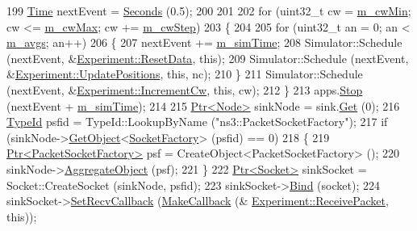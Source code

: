 \begin{DoxyCode}
199     \hyperlink{classns3_1_1Time}{Time} nextEvent = \hyperlink{group__timecivil_ga33c34b816f8ff6628e33d5c8e9713b9e}{Seconds} (0.5);
200 
201 
202     \textcolor{keywordflow}{for} (uint32\_t cw = \hyperlink{classExperiment_a2dbf3ad2a9b3a535c8bb9bb128e47ad3}{m\_cwMin}; cw <= \hyperlink{classExperiment_a3be9291afcc8b97db510b56314701946}{m\_cwMax}; cw += \hyperlink{classExperiment_aef4f5d42255d8ebf188b6d760eb7992b}{m\_cwStep})
203       \{
204 
205         \textcolor{keywordflow}{for} (uint32\_t an = 0; an < \hyperlink{classExperiment_a51ad00a867fb74254c5ec3d4e0e34272}{m\_avgs}; an++)
206           \{
207             nextEvent += \hyperlink{classExperiment_a3440bfac76174e478b35aa810d17543c}{m\_simTime};
208             Simulator::Schedule (nextEvent, &\hyperlink{classExperiment_a587b704eb6e44c0f573005464f1dc880}{Experiment::ResetData}, \textcolor{keyword}{this});
209             Simulator::Schedule (nextEvent, &\hyperlink{classExperiment_a235b38a9d7884a3381c1da4cc5c794ca}{Experiment::UpdatePositions}, \textcolor{keyword}{this}, 
      nc);
210           \}
211         Simulator::Schedule (nextEvent, &\hyperlink{classExperiment_ab252998a0101be7d45e2c766eb0e2c85}{Experiment::IncrementCw}, \textcolor{keyword}{this}, cw);
212       \}
213     apps.\hyperlink{classns3_1_1ApplicationContainer_adfc52f9aa4020c8714679b00bbb9ddb3}{Stop} (nextEvent + \hyperlink{classExperiment_a3440bfac76174e478b35aa810d17543c}{m\_simTime});
214 
215     \hyperlink{classns3_1_1Ptr}{Ptr<Node>} sinkNode = sink.\hyperlink{classns3_1_1NodeContainer_a9ed96e2ecc22e0f5a3d4842eb9bf90bf}{Get} (0);
216     \hyperlink{classns3_1_1TypeId}{TypeId} psfid = TypeId::LookupByName (\textcolor{stringliteral}{"ns3::PacketSocketFactory"});
217     \textcolor{keywordflow}{if} (sinkNode->\hyperlink{classns3_1_1Object_a13e18c00017096c8381eb651d5bd0783}{GetObject}<\hyperlink{classns3_1_1SocketFactory}{SocketFactory}> (psfid) == 0)
218       \{
219         \hyperlink{classns3_1_1Ptr}{Ptr<PacketSocketFactory>} psf = CreateObject<PacketSocketFactory> ();
220         sinkNode->\hyperlink{classns3_1_1Object_a79dd435d300f3deca814553f561a2922}{AggregateObject} (psf);
221       \}
222     \hyperlink{classns3_1_1Ptr}{Ptr<Socket>} sinkSocket = Socket::CreateSocket (sinkNode, psfid);
223     sinkSocket->\hyperlink{classns3_1_1Socket_ada93439a43de2028b5a8fc6621dad482}{Bind} (socket);
224     sinkSocket->\hyperlink{classns3_1_1Socket_a243f7835ef1a85f9270fd3577e3a40da}{SetRecvCallback} (\hyperlink{group__makecallbackmemptr_ga9376283685aa99d204048d6a4b7610a4}{MakeCallback} (&
      \hyperlink{classExperiment_a71b89b6aeef271abd148ac8c9dc246d4}{Experiment::ReceivePacket}, \textcolor{keyword}{this}));

\end{DoxyCode}

